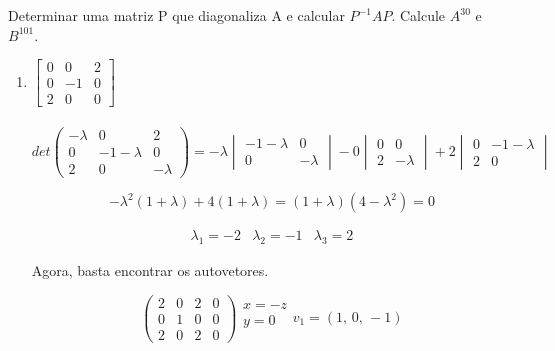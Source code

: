 \item Determinar uma matriz P que diagonaliza A
e calcular $P^{-1}AP$. Calcule $A^{30}$ e $B^{101}$.

\begin{enumerate}
	\item
	$
	\begin{bmatrix}
		0 &  0 & 2 \\
		0 & -1 & 0 \\
		2 &  0 & 0
	\end{bmatrix}
	$
	\\ \\
	\solucao
	$$
	det 
	\begin{pmatrix}
		-\lambda &  0 & 2 \\
		0        & -1 - \lambda & 0 \\
		2 &  0 & - \lambda
	\end{pmatrix}
	= -\lambda
	\begin{vmatrix}
		-1 -\lambda & 0 \\
		0 & -\lambda
	\end{vmatrix}
	-0
	\begin{vmatrix}
		0 & 0 \\
		2 & -\lambda
	\end{vmatrix}
	+2
	\begin{vmatrix}
		0 & -1 -\lambda \\
		2 & 0
	\end{vmatrix}
	$$

	$$-\lambda^2(1+\lambda)+4(1+\lambda) = (1+\lambda)(4-\lambda^2) = 0$$
	
	$$
	\begin{array}{ccc}
		\lambda_1 = -2 & \lambda_2 = -1 & \lambda_3 = 2
	\end{array}
	$$
	
	Agora, basta encontrar os autovetores.
	
	$$
	\begin{pmatrix}
		2 & 0 & 2 & 0 \\
		0 & 1 & 0 & 0 \\
		2 & 0 & 2 & 0
	\end{pmatrix}		
	\begin{array}{c}
		x = -z \\
		y = 0 \\
	\end{array}		
	v_1 = (1, \, 0, \, -1)	
	$$
	

\end{enumerate}
